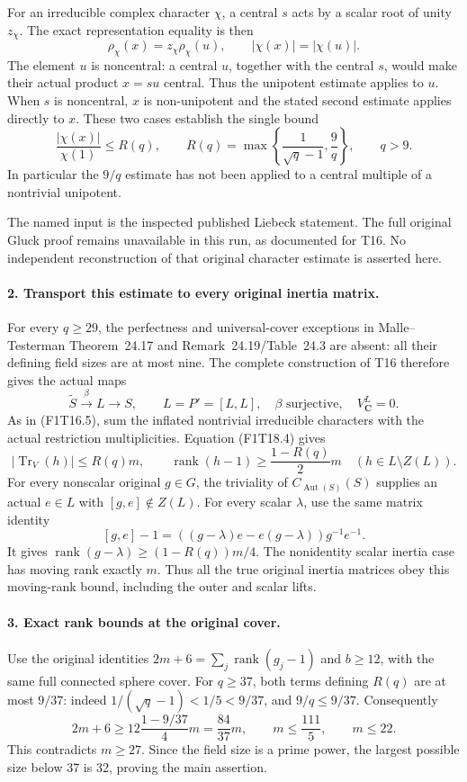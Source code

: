 For an irreducible complex character \(\chi\), a
central \(s\) acts by a scalar root of unity \(z_\chi\).
The exact representation equality is then
\[
 \rho_\chi(x)=z_\chi\rho_\chi(u),\qquad
 |\chi(x)|=|\chi(u)|.
 \tag{F1T18.3}
\]
The element \(u\) is noncentral: a central \(u\), together
with the central \(s\), would make their actual product
\(x=su\) central. Thus the unipotent estimate applies to
\(u\). When
\(s\) is noncentral, \(x\) is non-unipotent and the
stated second estimate applies directly to \(x\).
These two cases establish the single bound
\[
 \frac{|\chi(x)|}{\chi(1)}\le R(q),\qquad
 R(q)=\max\left\{\frac1{\sqrt q-1},\frac9q\right\},
 \qquad q>9.
 \tag{F1T18.4}
\]
In particular the \(9/q\) estimate has not been applied
to a central multiple of a nontrivial unipotent.

The named input is the inspected published Liebeck
statement. The full original Gluck proof remains
unavailable in this run, as documented for T16. No
independent reconstruction of that original character
estimate is asserted here.

\paragraph{2. Transport this estimate to every original inertia matrix.}
For every \(q\ge29\), the perfectness and universal-cover
exceptions in Malle--Testerman Theorem~24.17 and
Remark~24.19/Table~24.3 are absent: all their defining
field sizes are at most nine. The complete construction
of T16 therefore gives the actual maps
\[
 \widetilde S\xrightarrow{\beta}L\longrightarrow S,
 \qquad L=P'=[L,L],\quad \beta\text{ surjective},
 \quad V_{\mathbf C}^L=0.
 \tag{F1T18.5}
\]
As in (F1T16.5), sum the inflated nontrivial irreducible
characters with the actual restriction multiplicities.
Equation (F1T18.4) gives
\[
 |\operatorname{Tr}_V(h)|\le R(q)m,
 \qquad
 \operatorname{rank}(h-1)\ge\frac{1-R(q)}2m
 \quad(h\in L\setminus Z(L)).
 \tag{F1T18.6}
\]
For every nonscalar original \(g\in G\), the triviality
of \(C_{\operatorname{Aut}(S)}(S)\) supplies an actual
\(e\in L\) with \([g,e]\notin Z(L)\). For every scalar
\(\lambda\), use the same matrix identity
\[
 [g,e]-1=
   ((g-\lambda)e-e(g-\lambda))g^{-1}e^{-1}.
 \tag{F1T18.7}
\]
It gives
\(\operatorname{rank}(g-\lambda)\ge(1-R(q))m/4\).
The nonidentity scalar inertia case has moving rank
exactly \(m\). Thus all the true original inertia
matrices obey this moving-rank bound, including the
outer and scalar lifts.

\paragraph{3. Exact rank bounds at the original cover.}
Use the original identities
\(2m+6=\sum_j\operatorname{rank}(g_j-1)\) and
\(b\ge12\), with the same full connected sphere cover.
For \(q\ge37\), both terms defining \(R(q)\) are at
most \(9/37\): indeed
\(1/(\sqrt q-1)<1/5<9/37\), and \(9/q\le9/37\).
Consequently
\[
 2m+6\ge12\frac{1-9/37}{4}m=\frac{84}{37}m,
 \qquad m\le\frac{111}{5},\qquad m\le22.
 \tag{F1T18.8}
\]
This contradicts \(m\ge27\). Since the field size is a
prime power, the largest possible size below 37 is 32,
proving the main assertion.


